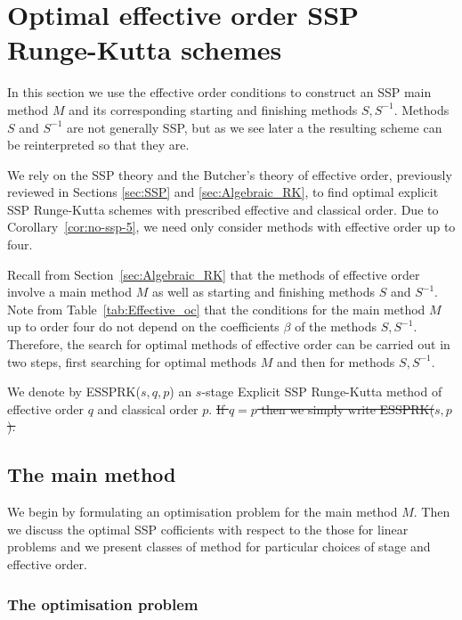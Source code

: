 \section{Optimal effective order SSP Runge-Kutta schemes}\label{sec:Optimal_ESSPRK}
In this section we use the effective order conditions to
construct an SSP main method $M$ and its corresponding starting and finishing
methods $S,S^{-1}$.  Methods $S$ and $S^{-1}$ are not generally SSP, but as we see later a the resulting scheme can be reinterpreted so that they are.

We rely on the SSP theory and the Butcher's theory of effective order,
previously reviewed in Sections \ref{sec:SSP} and \ref{sec:Algebraic_RK}, to
find optimal explicit SSP Runge-Kutta schemes with prescribed effective and classical order.  Due to Corollary~\ref{cor:no-ssp-5}, we need only consider methods with effective order 
up to four.

Recall from Section~\ref{sec:Algebraic_RK} that the methods of effective order involve
a main method $M$ as well as starting and finishing methods $S$ and $S^{-1}$.
Note from Table~\ref{tab:Effective_oc} that the conditions for the main method $M$
up to order four do not depend on the coefficients $\beta$ of the methods $S,S^{-1}$. 
Therefore, the search for optimal methods of effective order can be carried out in
two steps, first searching for optimal methods $M$ and then for methods $S,S^{-1}$.


We denote by ESSPRK($s,q,p$) an $s$-stage Explicit SSP Runge-Kutta method of
effective order $q$ and classical order $p$.
\sout{If $q=p$ then we simply write ESSPRK($s,p$).}

\subsection{The main method}\label{subsection3.1}

We begin by formulating an optimisation problem for the main method $M$. Then we discuss 
the optimal SSP cofficients with respect to the those for linear problems and we present classes of method for particular choices of stage and effective order.

\subsubsection{The optimisation problem\label{subsection3.1.1}}

